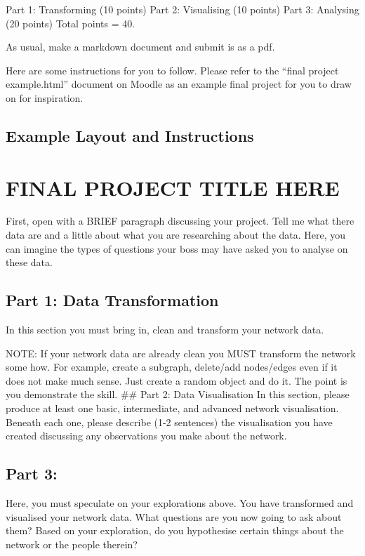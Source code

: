 \documentclass[
  letterpaper,
  DIV=11,
  numbers=noendperiod]{scrreprt}
\begin{document}
Part 1: Transforming (10 points) Part 2: Visualising (10 points) Part 3:
Analysing (20 points) Total points = 40.

As usual, make a markdown document and submit is as a pdf.

Here are some instructions for you to follow. Please refer to the
``final project example.html'' document on Moodle as an example final
project for you to draw on for inspiration.

\section{Example Layout and
Instructions}\label{example-layout-and-instructions}

\chapter{FINAL PROJECT TITLE HERE}\label{final-project-title-here}

First, open with a BRIEF paragraph discussing your project. Tell me what
there data are and a little about what you are researching about the
data. Here, you can imagine the types of questions your boss may have
asked you to analyse on these data.

\section{Part 1: Data Transformation}\label{part-1-data-transformation}

In this section you must bring in, clean and transform your network
data.

NOTE: If your network data are already clean you MUST transform the
network some how. For example, create a subgraph, delete/add nodes/edges
even if it does not make much sense. Just create a random object and do
it. The point is you demonstrate the skill. \#\# Part 2: Data
Visualisation In this section, please produce at least one basic,
intermediate, and advanced network visualisation. Beneath each one,
please describe (1-2 sentences) the visualisation you have created
discussing any observations you make about the network.

\section{Part 3:}\label{part-3}

Here, you must speculate on your explorations above. You have
transformed and visualised your network data. What questions are you now
going to ask about them? Based on your exploration, do you hypothesise
certain things about the network or the people therein?
\end{document}
